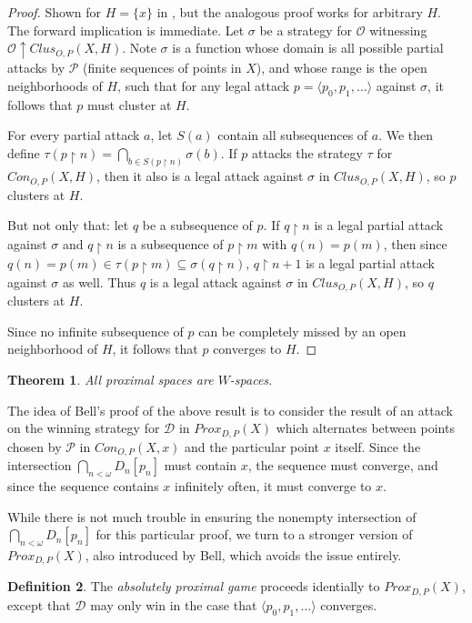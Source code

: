 \documentclass{amsart}
\newtheorem{thm}{Theorem}[section]
\theoremstyle{definition}
\newtheorem{defn}[thm]{Definition}
\theoremstyle{remark}
\newcommand{\<}{\langle}
\renewcommand{\>}{\rangle}
\newcommand{\proxgame}[1]{Prox_{D,P}(#1)}
\newcommand{\congame}[2]{Con_{O,P}(#1,#2)}
\newcommand{\clusgame}[2]{Clus_{O,P}(#1,#2)}
\newcommand{\pl}[1]{\mathscr{#1}}
\newcommand{\win}{\uparrow}
\newcommand{\rest}{\restriction}
\newcommand{\term}{\textit}
\begin{document}
\begin{proof}
  Shown for $H=\{x\}$ in \cite{ginfinite}, but the analogous proof works for arbitrary $H$. The forward implication is immediate. Let $\sigma$ be a strategy for $\pl O$ witnessing $\pl O\win \clusgame{X}{H}$. Note $\sigma$ is a function whose domain is all possible partial attacks by $\pl P$ (finite sequences of points in $X$), and whose range is the open neighborhoods of $H$, such that for any legal attack $p=\<p_0,p_1,\dots\>$ against $\sigma$, it follows that $p$ must cluster at $H$.

  For every partial attack $a$, let $S(a)$ contain all subsequences of $a$. We then define $\tau(p\rest n)=\bigcap_{b\in S(p\rest n)}\sigma(b)$. If $p$ attacks the strategy $\tau$ for $\congame{X}{H}$, then it also is a legal attack against $\sigma$ in $\clusgame{X}{H}$, so $p$ clusters at $H$.

  But not only that: let $q$ be a subsequence of $p$. If $q\rest n$ is a legal partial attack against $\sigma$ and $q\rest n$ is a subsequence of $p\rest m$ with $q(n)=p(m)$, then since $q(n)=p(m)\in\tau(p\rest m)\subseteq\sigma(q\rest n)$, $q\rest n+1$ is a legal partial attack against $\sigma$ as well. Thus $q$ is a legal attack against $\sigma$ in $\clusgame{X}{H}$, so $q$ clusters at $H$.

  Since no infinite subsequence of $p$ can be completely missed by an open neighborhood of $H$, it follows that $p$ converges to $H$.
\end{proof}

\begin{thm}\cite{b}
  All proximal spaces are $W$-spaces.
\end{thm}


   The idea of Bell's proof of the above result is to consider the result of an attack on the winning strategy for $\pl D$ in $\proxgame{X}$ which alternates between points chosen by $\pl P$ in $\congame{X}{x}$ and the particular point $x$ itself. Since the intersection $\bigcap_{n<\omega} D_n[p_n]$ must contain $x$, the sequence must converge, and since the sequence contains $x$ infinitely often, it must converge to $x$.


While there is not much trouble in ensuring the nonempty intersection of\\ $\bigcap_{n<\omega} D_n[p_n]$ for this particular proof, we turn to a stronger version of $\proxgame{X}$, also introduced by Bell, which avoids the issue entirely.

\begin{defn}
  The \term{absolutely proximal game}  proceeds identially to $\proxgame{X}$, except that $\pl D$ may only win in the case that $\<p_0,p_1,\dots\>$ converges.
\end{defn}
\end{document}
